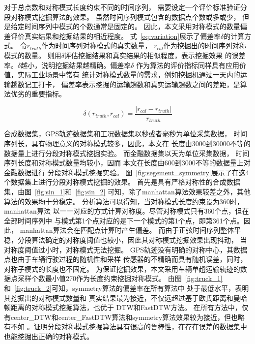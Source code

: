 对于总点数和对称模式长度约束不同的时间序列，
需要设定一个评价标准验证分段对称模式挖掘算法的效果。
虽然时间序列模式包含的数据点个数或多或少，
但是给定时间序列中模式的个数通常是固定的。
因此，本文采用对称模式的数量偏差评价真实结果和挖掘结果的相近程度。
式~\ref{eq:variation}展示了偏差率$\delta$的计算方式。
令$r_{truth}$作为时间序列对称模式的真实数量，
$r_{cal}$作为挖掘出的时间序列对称模式的数量。
则用$\delta$评估挖掘结果和真实结果的相似程度，表示挖掘效果
的误差率。$\delta$越小，说明挖掘结果越精确。偏差率$\delta$
作为算法的评价指标同样具有应用价值，实际工业场景中常有
统计对称模式数量的需求，例如挖掘机通过一天内的运输趟数记工打卡，
偏差率表示挖掘的运输趟数和真实运输趟数之间的差距，是算法优劣的重要指标。

\begin{equation}
  \delta \left( r_{truth}, r_{cal} \right) = \frac{\left| r_{cal} - r_{truth} \right|}{r_{truth}}
  \label{eq:variation}
\end{equation}

合成数据集，GPS轨迹数据集和工况数据集以秒或者毫秒为单位采集数据，
时间序列长，具有物理意义的对称模式较多，因此，本文在
长度由3000到30000不等的数据量上进行分段对称模式挖掘实验。
而金融数据集以天为单位采集数据，
时间序列长度和对称模式数量均较小，因而
本文在长度由600到3000不等的数据量上对金融数据进行
分段对称模式挖掘实验。
图~\ref{fig:segement_symmetry}展示了在这4个数据集上进行分段对称模式挖掘的效果。
首先是具有严格对称性的合成数据集，由图~\ref{fig:sin_1}和~\ref{fig:sin_2}
可知，除了manhattan算法效果较差之外，其他算法的效果均十分稳定。
分析算法可以得知，当对称模式长度约束设为360时，manhattan算法
以一一对应的方式计算对称度。尽管对称模式只有360个点，但在全部时间序列中
与模式第1个点对应的是下一个模式的第1个点，即第361个点。因此，
manhattan算法会在匹配点计算时产生偏差。
而由于正弦时间序列整体平稳，分段算法确定的对称度阈值也较小，因此其对称模式挖掘效果出现抖动，
当对称度阈值过小时，对称模式无法挖掘。
GPS轨迹没有明确的对称中心，其数据点也由于车辆行驶过程的随机性和采样
传感器的不精确而具有随机误差，同时，对称子模式的长度也不固定。
为保证挖掘效果，本文采用车辆单趟运输轨迹的数据点采样个数最小值270作为长度约束挖掘对称模式。
由图~\ref{fig:truck_1}和~\ref{fig:truck_2}可知，symmetry算法的偏差率在所有算法中
处于最低水平，表明其挖掘出的对称模式数量和
真实结果最为接近，不仅远超过基于欧氏距离和曼哈顿距离的对称模式挖掘算法，也优于
DTW和FastDTW方法。
在所有方法中，仅有center\_DTW和center\_FastDTW算法和symmetry算法效果较为接近，但也略有不如
。证明分段对称模式挖掘算法具有很高的鲁棒性，在存在误差的数据集中
也能挖掘出正确的对称模式。

